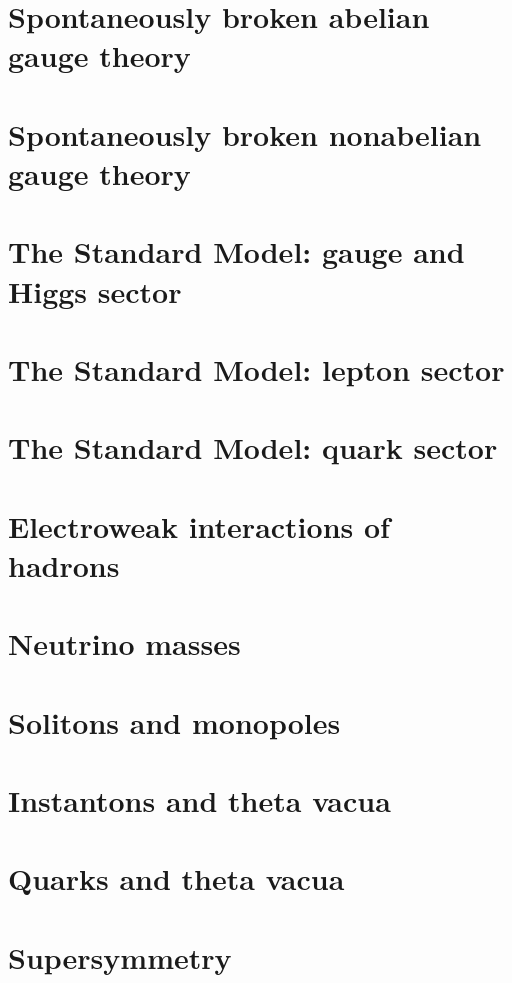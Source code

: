\documentclass[twoside]{amsart}
\begin{document}
\section{ Spontaneously broken abelian gauge theory}

\section{ Spontaneously broken nonabelian gauge theory}

\section{The Standard Model: gauge and Higgs sector}

\section{The Standard Model: lepton sector}

\section{The Standard Model: quark sector}

\section{Electroweak interactions of hadrons}

\section{Neutrino masses}

\section{Solitons and monopoles }

\section{Instantons and theta vacua}

\section{Quarks and theta vacua}

\section{Supersymmetry}
\end{document}
